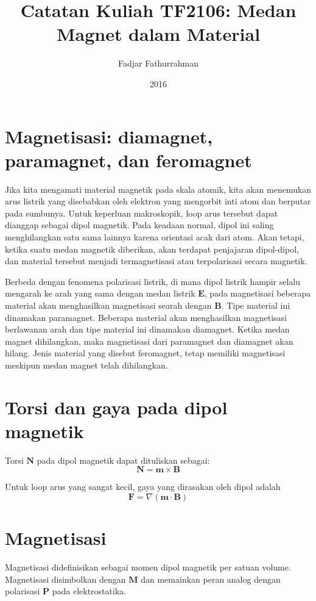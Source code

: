 \documentclass[10pt,english,twocolumn,fleqn]{extarticle}
\begin{document}
\title{Catatan Kuliah TF2106: Medan Magnet dalam Material}
\author{Fadjar Fathurrahman}
\date{2016}
\maketitle

\section{Magnetisasi: diamagnet, paramagnet, dan feromagnet}
Jika kita mengamati material magnetik pada skala atomik, kita akan menemukan arus
listrik yang disebabkan oleh elektron yang mengorbit inti atom dan berputar
pada sumbunya. Untuk keperluan makroskopik, loop arus tersebut dapat dianggap
sebagai dipol magnetik. Pada keadaan normal, dipol ini saling menghilangkan satu
sama lainnya karena orientasi acak dari atom. Akan tetapi, ketika suatu medan
magnetik diberikan, akan terdapat penjajaran dipol-dipol, dan material tersebut
menjadi termagnetisasi atau terpolarisasi secara magnetik.

Berbeda dengan fenomena polarisasi listrik, di mana dipol listrik hampir selalu mengarah
ke arah yang sama dengan medan listrik $\mathbf{E}$, pada magnetisasi beberapa
material akan menghasilkan magnetisasi searah dengan $\mathbf{B}$.
Tipe material ini dinamakan paramagnet.
Beberapa material akan menghasilkan magnetisasi berlawanan arah dan tipe material
ini dinamakan diamagnet.
Ketika medan magnet dihilangkan, maka magnetisasi dari paramagnet dan diamagnet
akan hilang. Jenis material yang disebut feromagnet, tetap memiliki magnetisasi
meskipun medan magnet telah dihilangkan.

\section{Torsi dan gaya pada dipol magnetik}

Torsi $\mathbf{N}$ pada dipol magnetik dapat dituliskan sebagai:
\begin{equation}
\mathbf{N} = \mathbf{m} \times \mathbf{B}
\end{equation}

Untuk loop arus yang sangat kecil, gaya yang dirasakan oleh dipol
adalah
\begin{equation}
\mathbf{F} = \nabla(\mathbf{m}\cdot\mathbf{B})
\end{equation}

\section{Magnetisasi}
Magnetisasi didefinisikan sebagai momen dipol magnetik per satuan volume.
Magnetisasi disimbolkan dengan $\mathbf{M}$ dan memainkan peran analog
dengan polarisasi $\mathbf{P}$ pada elektrostatika.
\end{document}
